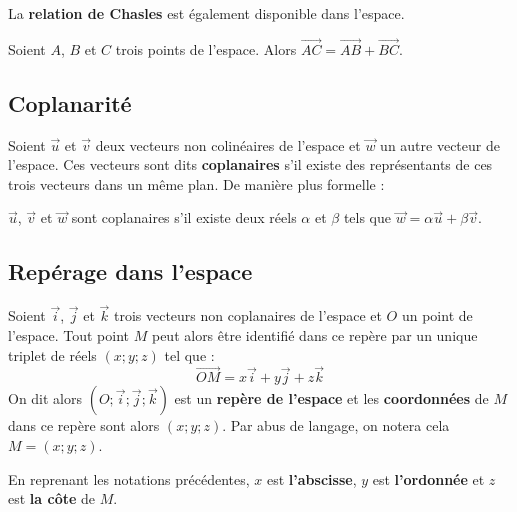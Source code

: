 	La \textbf{relation de Chasles} est également disponible dans l'espace.

	\begin{formula}
		Soient $A$, $B$ et $C$ trois points de l'espace. Alors $\overrightarrow{AC} = \overrightarrow{AB} + \overrightarrow{BC}$.
	\end{formula}

	\subsection{Coplanarité}

	Soient $\overrightarrow{u}$ et $\overrightarrow{v}$ deux vecteurs non colinéaires de l'espace et $\overrightarrow{w}$ un autre vecteur de l'espace. Ces vecteurs sont dits \textbf{coplanaires} s'il existe des représentants de ces trois vecteurs dans un même plan. De manière plus formelle :

	\begin{formula}[Définition]
		$\overrightarrow{u}$, $\overrightarrow{v}$ et $\overrightarrow{w}$ sont coplanaires s'il existe deux réels $\alpha$ et $\beta$ tels que $\overrightarrow{w} = \alpha \overrightarrow{u} + \beta \overrightarrow{v}$.
	\end{formula}

	\subsection{Repérage dans l'espace}

	\begin{formula}
		Soient $\overrightarrow{i}$, $\overrightarrow{j}$ et $\overrightarrow{k}$ trois vecteurs non coplanaires de l'espace et $O$ un point de l'espace.
		Tout point $M$ peut alors être identifié dans ce repère par un unique triplet de réels $(x;y;z)$ tel que :
		\[ \overrightarrow{OM} = x\overrightarrow{i} + y\overrightarrow{j} + z\overrightarrow{k} \]
		On dit alors $(O ; \overrightarrow{i} ; \overrightarrow{j} ; \overrightarrow{k})$ est un \textbf{repère de l'espace} et les \textbf{coordonnées} de $M$ dans ce repère sont alors $(x; y; z)$. Par abus de langage, on notera cela $M = (x; y; z)$.
	\end{formula}

	\begin{tip}
		En reprenant les notations précédentes, $x$ est \textbf{l'abscisse}, $y$ est \textbf{l'ordonnée} et $z$ est \textbf{la côte} de $M$.
	\end{tip}

